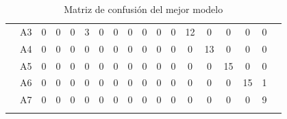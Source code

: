 \documentclass[12pt]{article}
\begin{document}
\begin{table}[!ht]
{\begin{tabular}{cccccccccccccccccc}
			& \multicolumn{1}{c|}{A3} & \multicolumn{1}{c|}{0} & \multicolumn{1}{c|}{0} & \multicolumn{1}{c|}{0} & \multicolumn{1}{c|}{3}  & \multicolumn{1}{c|}{0}  & \multicolumn{1}{c|}{0}  & \multicolumn{1}{c|}{0}  & \multicolumn{1}{c|}{0}  & \multicolumn{1}{c|}{0}  & \multicolumn{1}{c|}{0}  & \multicolumn{1}{c|}{12} & \multicolumn{1}{c|}{0}  & \multicolumn{1}{c|}{0}  & \multicolumn{1}{c|}{0}  & \multicolumn{1}{c|}{0} &  \\ \cline{3-17}
			& \multicolumn{1}{c|}{A4} & \multicolumn{1}{c|}{0} & \multicolumn{1}{c|}{0} & \multicolumn{1}{c|}{0} & \multicolumn{1}{c|}{0}  & \multicolumn{1}{c|}{0}  & \multicolumn{1}{c|}{0}  & \multicolumn{1}{c|}{0}  & \multicolumn{1}{c|}{0}  & \multicolumn{1}{c|}{0}  & \multicolumn{1}{c|}{0}  & \multicolumn{1}{c|}{0}  & \multicolumn{1}{c|}{13} & \multicolumn{1}{c|}{0}  & \multicolumn{1}{c|}{0}  & \multicolumn{1}{c|}{0} &  \\ \cline{3-17}
			& \multicolumn{1}{c|}{A5} & \multicolumn{1}{c|}{0} & \multicolumn{1}{c|}{0} & \multicolumn{1}{c|}{0} & \multicolumn{1}{c|}{0}  & \multicolumn{1}{c|}{0}  & \multicolumn{1}{c|}{0}  & \multicolumn{1}{c|}{0}  & \multicolumn{1}{c|}{0}  & \multicolumn{1}{c|}{0}  & \multicolumn{1}{c|}{0}  & \multicolumn{1}{c|}{0}  & \multicolumn{1}{c|}{0}  & \multicolumn{1}{c|}{15} & \multicolumn{1}{c|}{0}  & \multicolumn{1}{c|}{0} &  \\ \cline{3-17}
			& \multicolumn{1}{c|}{A6} & \multicolumn{1}{c|}{0} & \multicolumn{1}{c|}{0} & \multicolumn{1}{c|}{0} & \multicolumn{1}{c|}{0}  & \multicolumn{1}{c|}{0}  & \multicolumn{1}{c|}{0}  & \multicolumn{1}{c|}{0}  & \multicolumn{1}{c|}{0}  & \multicolumn{1}{c|}{0}  & \multicolumn{1}{c|}{0}  & \multicolumn{1}{c|}{0}  & \multicolumn{1}{c|}{0}  & \multicolumn{1}{c|}{0}  & \multicolumn{1}{c|}{15} & \multicolumn{1}{c|}{1} &  \\ \cline{3-17}
			& \multicolumn{1}{c|}{A7} & \multicolumn{1}{c|}{0} & \multicolumn{1}{c|}{0} & \multicolumn{1}{c|}{0} & \multicolumn{1}{c|}{0}  & \multicolumn{1}{c|}{0}  & \multicolumn{1}{c|}{0}  & \multicolumn{1}{c|}{0}  & \multicolumn{1}{c|}{0}  & \multicolumn{1}{c|}{0}  & \multicolumn{1}{c|}{0}  & \multicolumn{1}{c|}{0}  & \multicolumn{1}{c|}{0}  & \multicolumn{1}{c|}{0}  & \multicolumn{1}{c|}{0}  & \multicolumn{1}{c|}{9} &  \\ \cline{3-17}
			&                         &                        &                        &                        &                         &                         &                         &                         &                         &                         &                         &                         &                         &                         &                         &                        & 
		\end{tabular}
	}
	\caption{Matriz de confusión del mejor modelo}
	\label{tab:confusion_matrix_2}
\end{table}
\end{document}
